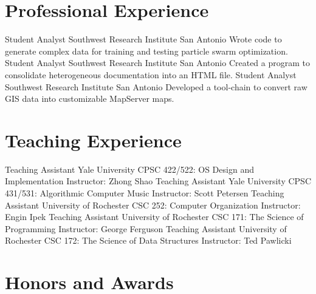 \documentclass[10pt,letterpaper,sans]{moderncv}
\begin{document}
\section{Professional Experience}

        {Student Analyst}
        {Southwest Research Institute}
        {San Antonio}
        {}
        {Wrote code to generate complex data for training and testing particle
         swarm optimization.}
        {Student Analyst}
        {Southwest Research Institute}
        {San Antonio}
        {}
        {Created a program to consolidate heterogeneous documentation into an
         HTML file.}
        {Student Analyst}
        {Southwest Research Institute}
        {San Antonio}
        {}
        {Developed a tool-chain to convert raw GIS data into customizable
         MapServer maps.}

\section{Teaching Experience}

        {Teaching Assistant}
        {Yale University}
        {CPSC 422/522: OS Design and Implementation}
        {}
        {Instructor: Zhong Shao}
        {Teaching Assistant}
        {Yale University}
        {CPSC 431/531: Algorithmic Computer Music}
        {}
        {Instructor: Scott Petersen}
        {Teaching Assistant}
        {University of Rochester}
        {CSC 252: Computer Organization}
        {}
        {Instructor: Engin Ipek}
        {Teaching Assistant}
        {University of Rochester}
        {CSC 171: The Science of Programming}
        {}
        {Instructor: George Ferguson}
        {Teaching Assistant}
        {University of Rochester}
        {CSC 172: The Science of Data Structures}
        {}
        {Instructor: Ted Pawlicki}

\section{Honors and Awards}

\end{document}
